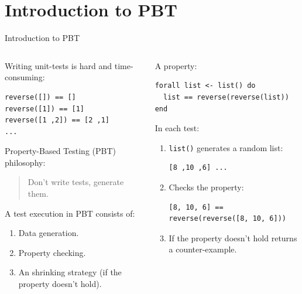 \documentclass[aspectratio=169, 10pt]{beamer}
\begin{document}
\section{Introduction to PBT}
\label{sec:org9143359}
\begin{frame}[label={sec:org3804359},fragile]{Introduction to PBT}
 \begin{columns}
\begin{column}{0.48\columnwidth}
\onslide<+->
\onslide<+->
Writing unit-tests is hard and time-consuming:
\onslide<+->
\lstset{language=elixir,label= ,caption= ,captionpos=b,numbers=none,style=display}
\begin{lstlisting}
reverse([]) == []
reverse([1]) == [1]
reverse([1 ,2]) == [2 ,1]
...
\end{lstlisting}
\vspace{10pt}
\onslide<+->
Property-Based Testing (PBT) philosophy:
\onslide<+->
\begin{quote}
Don't write tests, generate them.
\end{quote}


\onslide<+->
A test execution in PBT consists of:
\onslide<+->
\begin{enumerate}
\item Data generation.
\onslide<+->
\item Property checking.
\onslide<+->
\item An shrinking strategy (if the property doesn't hold).
\onslide<+->
\end{enumerate}
\end{column}

\begin{column}{0.48\columnwidth}
A property:
\onslide<+->
\lstset{language=elixir,label= ,caption= ,captionpos=b,numbers=none,style=display}
\begin{lstlisting}
forall list <- list() do
  list == reverse(reverse(list))
end
\end{lstlisting}
\onslide<+->
In each test:
\begin{enumerate}
\item \texttt{list()} generates a random list:
\onslide<+->
\lstset{language=elixir,label= ,caption= ,captionpos=b,numbers=none,style=display}
\begin{lstlisting}
[8 ,10 ,6] ...
\end{lstlisting}
\item Checks the property:
\onslide<+->
\lstset{language=elixir,label= ,caption= ,captionpos=b,numbers=none,style=display}
\begin{lstlisting}
[8, 10, 6] == reverse(reverse([8, 10, 6]))
\end{lstlisting}
\onslide<+->
\item If the property doesn't hold returns a counter-example.
\end{enumerate}
\end{column}
\end{columns}
\end{frame}
\end{document}
